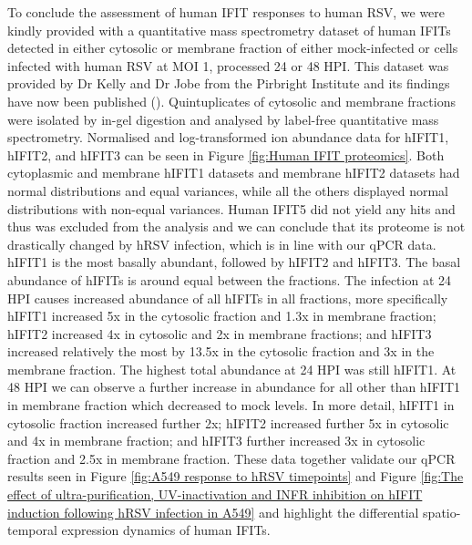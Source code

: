 To conclude the assessment of human IFIT responses to human RSV, we were kindly provided with a quantitative mass spectrometry dataset of human IFITs detected in either cytosolic or membrane fraction of either mock-infected or cells infected with human RSV at MOI 1, processed 24 or 48 HPI. This dataset was provided by Dr Kelly and Dr Jobe from the Pirbright Institute and its findings have now been published (\cite{Jobe2023ViralCondensates}). Quintuplicates of cytosolic and membrane fractions were isolated by in-gel digestion and analysed by label-free quantitative mass spectrometry. Normalised and log-transformed ion abundance data for hIFIT1, hIFIT2, and hIFIT3 can be seen in Figure \ref{fig:Human IFIT proteomics}. Both cytoplasmic and membrane hIFIT1 datasets and membrane hIFIT2 datasets had normal distributions and equal variances, while all the others displayed normal distributions with non-equal variances. Human IFIT5 did not yield any hits and thus was excluded from the analysis and we can conclude that its proteome is not drastically changed by hRSV infection, which is in line with our qPCR data. hIFIT1 is the most basally abundant, followed by hIFIT2 and hIFIT3. The basal abundance of hIFITs is around equal between the fractions. The infection at 24 HPI causes increased abundance of all hIFITs in all fractions, more specifically hIFIT1 increased 5x in the cytosolic fraction and 1.3x in membrane fraction; hIFIT2 increased 4x in cytosolic and 2x in membrane fractions; and hIFIT3 increased relatively the most by 13.5x in the cytosolic fraction and 3x in the membrane fraction. The highest total abundance at 24 HPI was still hIFIT1. At 48 HPI we can observe a further increase in abundance for all other than hIFIT1 in membrane fraction which decreased to mock levels. In more detail, hIFIT1 in cytosolic fraction increased further 2x; hIFIT2 increased further 5x in cytosolic and 4x in membrane fraction; and hIFIT3 further increased 3x in cytosolic fraction and 2.5x in membrane fraction. These data together validate our qPCR results seen in Figure \ref{fig:A549 response to hRSV timepoints} and Figure \ref{fig:The effect of ultra-purification, UV-inactivation and INFR inhibition on hIFIT induction following hRSV infection in A549} and highlight the differential spatio-temporal expression dynamics of human IFITs.

